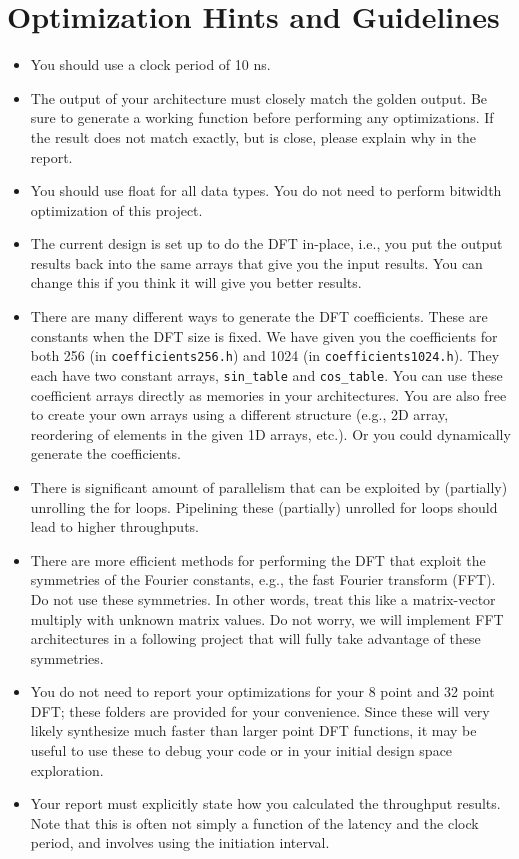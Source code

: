 \section{Optimization Hints and Guidelines}
\begin{itemize}
\item You should use a clock period of 10 ns.
\item The output of your architecture must closely match the golden output. Be sure to generate a working function before performing any optimizations. If the result does not match exactly, but is close, please explain why in the report.
\item You should use float for all data types. You do not need to perform bitwidth optimization of this project.
\item The current design is set up to do the DFT in-place, i.e., you put the output results back into the same arrays that give you the input results. You can change this if you think it will give you better results.
\item There are many different ways to generate the DFT coefficients. These are constants when the DFT size is fixed. We have given you the coefficients for both 256 (in \texttt{coefficients256.h}) and 1024 (in \texttt{coefficients1024.h}). They each have two constant arrays, \texttt{sin\_table} and \texttt{cos\_table}. You can use these coefficient arrays directly as memories in your architectures. You are also free to create your own arrays using a different structure (e.g., 2D array, reordering of elements in the given 1D arrays, etc.). Or you could dynamically generate the coefficients. 
\item There is significant amount of parallelism that can be exploited by (partially) unrolling the for loops. Pipelining these (partially) unrolled for loops should lead to higher throughputs.
\item There are more efficient methods for performing the DFT that exploit the symmetries of the Fourier constants, e.g., the fast Fourier transform (FFT). Do not use these symmetries. In other words, treat this like a matrix-vector multiply with unknown matrix values. Do not worry, we will implement FFT architectures in a following project that will fully take advantage of these symmetries.
\item You do not need to report your optimizations for your 8 point and 32 point DFT; these folders are provided for your convenience. Since these will very likely synthesize much faster than larger point DFT functions, it may be useful to use these to debug your code or in your initial design space exploration.
\item Your report must explicitly state how you calculated the throughput results. Note that this is often not simply a function of the latency and the clock period, and involves using the initiation interval.
\end{itemize}